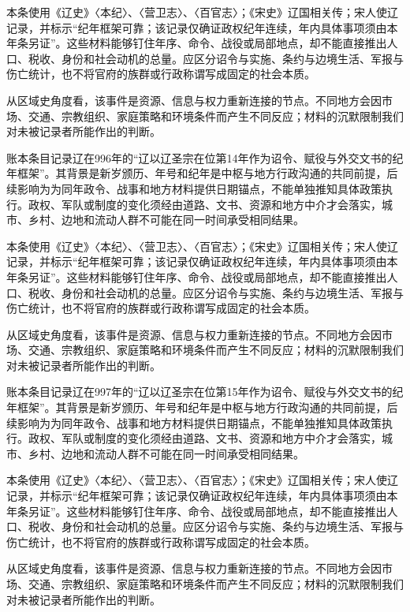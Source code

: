 本条使用《辽史》〈本纪〉、〈营卫志〉、〈百官志〉；《宋史》辽国相关传；宋人使辽记录，并标示“纪年框架可靠；该记录仅确证政权纪年连续，年内具体事项须由本年条另证”。这些材料能够钉住年序、命令、战役或局部地点，却不能直接推出人口、税收、身份和社会动机的总量。应区分诏令与实施、条约与边境生活、军报与伤亡统计，也不将官府的族群或行政称谓写成固定的社会本质。

从区域史角度看，该事件是资源、信息与权力重新连接的节点。不同地方会因市场、交通、宗教组织、家庭策略和环境条件而产生不同反应；材料的沉默限制我们对未被记录者所能作出的判断。

账本条目记录辽在996年的“辽以辽圣宗在位第14年作为诏令、赋役与外交文书的纪年框架”。其背景是新岁颁历、年号和纪年是中枢与地方行政沟通的共同前提，后续影响为为同年政令、战事和地方材料提供日期锚点，不能单独推知具体政策执行。政权、军队或制度的变化须经由道路、文书、资源和地方中介才会落实，城市、乡村、边地和流动人群不可能在同一时间承受相同结果。

本条使用《辽史》〈本纪〉、〈营卫志〉、〈百官志〉；《宋史》辽国相关传；宋人使辽记录，并标示“纪年框架可靠；该记录仅确证政权纪年连续，年内具体事项须由本年条另证”。这些材料能够钉住年序、命令、战役或局部地点，却不能直接推出人口、税收、身份和社会动机的总量。应区分诏令与实施、条约与边境生活、军报与伤亡统计，也不将官府的族群或行政称谓写成固定的社会本质。

从区域史角度看，该事件是资源、信息与权力重新连接的节点。不同地方会因市场、交通、宗教组织、家庭策略和环境条件而产生不同反应；材料的沉默限制我们对未被记录者所能作出的判断。

账本条目记录辽在997年的“辽以辽圣宗在位第15年作为诏令、赋役与外交文书的纪年框架”。其背景是新岁颁历、年号和纪年是中枢与地方行政沟通的共同前提，后续影响为为同年政令、战事和地方材料提供日期锚点，不能单独推知具体政策执行。政权、军队或制度的变化须经由道路、文书、资源和地方中介才会落实，城市、乡村、边地和流动人群不可能在同一时间承受相同结果。

本条使用《辽史》〈本纪〉、〈营卫志〉、〈百官志〉；《宋史》辽国相关传；宋人使辽记录，并标示“纪年框架可靠；该记录仅确证政权纪年连续，年内具体事项须由本年条另证”。这些材料能够钉住年序、命令、战役或局部地点，却不能直接推出人口、税收、身份和社会动机的总量。应区分诏令与实施、条约与边境生活、军报与伤亡统计，也不将官府的族群或行政称谓写成固定的社会本质。

从区域史角度看，该事件是资源、信息与权力重新连接的节点。不同地方会因市场、交通、宗教组织、家庭策略和环境条件而产生不同反应；材料的沉默限制我们对未被记录者所能作出的判断。

